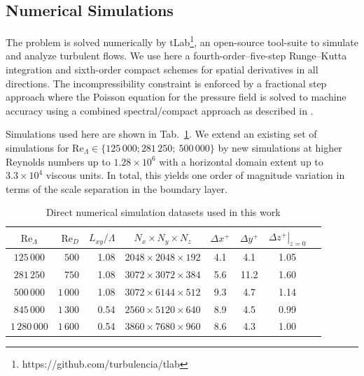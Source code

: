 \documentclass[a4paper,11pt]{amsart}
\newcommand{\RE}{\mathrm{Re}}
\begin{document}
\subsection{Numerical Simulations}
The problem is solved numerically by tLab\footnote{https://github.com/turbulencia/tlab},
an open-source tool-suite to simulate and analyze turbulent flows.
% 
We use here a fourth-order--five-step Runge--Kutta integration and sixth-order compact schemes
for spatial derivatives in all directions.
%
The incompressibility constraint is enforced by a fractional step approach where the Poisson equation
for the pressure field is solved to machine accuracy using a combined spectral/compact approach as
described in \citet{mellado:ZaM2012}.
%
\par
%
Simulations used here are shown in Tab.~\ref{tab:sim-setup}.
%
We extend an existing set of simulations for $\RE_\Lambda\in\{125\,000; 281\,250;\ 500\,000\}$ \citep[gray shading; cf.][]{ansorge:BM2014,ansorge:JFM2016} 
by new simulations at higher Reynolds numbers up to $1.28\times10^6$ with a horizontal domain extent up to $3.3\times 10^4$ viscous units. 
%
In total, this yields one order of magnitude variation in terms of the scale separation in the boundary layer.
%
\begin{table}
  \caption{Direct numerical simulation datasets used in this
    work \label{tab:sim-setup}}
  \begin{tabular}{c r r c c c c c}
    \toprule 
    $\RE_\Lambda$ & $\RE_D$ & $L_{xy}/\Lambda$ & $N_x\times N_y\times N_z$ & $\Delta x^+$ & $\Delta y^+$ & $\left.\Delta z^+\right|_{z=0}$ \\ 
    \midrule
    \rowcolor{gray!30}
       $125\,000$ &    $500$& 1.08 & $2048\times2048\times192$&4.1& 4.1& 1.05\\
    \rowcolor{gray!30}
       $281\,250$ & $   750$& 1.08 & $3072\times3072\times384$&5.6&11.2& 1.60\\
    \rowcolor{gray!30}
       $500\,000$ & $1\,000$& 1.08 & $3072\times6144\times512$&9.3& 4.7& 1.14\\
    \midrule
       $845\,000$ & $1\,300$& 0.54 & $2560\times5120\times640$&8.9& 4.5& 0.99\\

    $1\,280\,000$ & $1\,600$& 0.54 & $3860\times7680\times960$&8.6& 4.3& 1.00\\ 
    \bottomrule 
  \end{tabular} 
\end{table}
%
\end{document}
